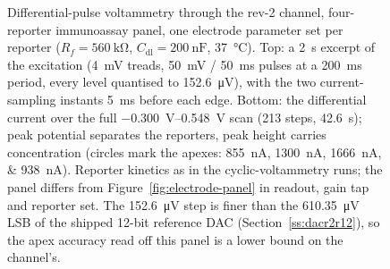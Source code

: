 \begin{figure}[htbp]
{  Differential-pulse voltammetry through the rev-2 channel, four-reporter
  immunoassay panel, one electrode parameter set per reporter
  (\(R_f = \SI{560}{\kilo\ohm}\), \(C_{\mathrm{dl}} = \SI{200}{\nano\farad}\),
  \SI{37}{\celsius}). Top: a \SI{2}{\second} excerpt of the excitation
  (\SI{4}{\milli\volt} treads, \SI{50}{\milli\volt} / \SI{50}{\milli\second}
  pulses at a \SI{200}{\milli\second} period, every level quantised to
  \SI{152.6}{\micro\volt}), with the two current-sampling instants
  \SI{5}{\milli\second} before each edge. Bottom: the differential current over the full
  \SIrange{-0.300}{0.548}{\volt} scan (213 steps, \SI{42.6}{\second});
  peak potential separates the reporters, peak height carries concentration
  (circles mark the apexes: \SIlist{855;1300;1666;938}{\nano\ampere}).
  Reporter kinetics as in the cyclic-voltammetry runs; the panel differs from
  Figure~\ref{fig:electrode-panel} in readout, gain tap and reporter set. The
  \SI{152.6}{\micro\volt} step is finer than the \SI{610.35}{\micro\volt} LSB of
  the shipped 12-bit reference DAC (Section~\ref{ss:dacr2r12}), so the apex
  accuracy read off this panel is a lower bound on the channel's.}
  \label{fig:electrode-dpv}
\end{figure}
